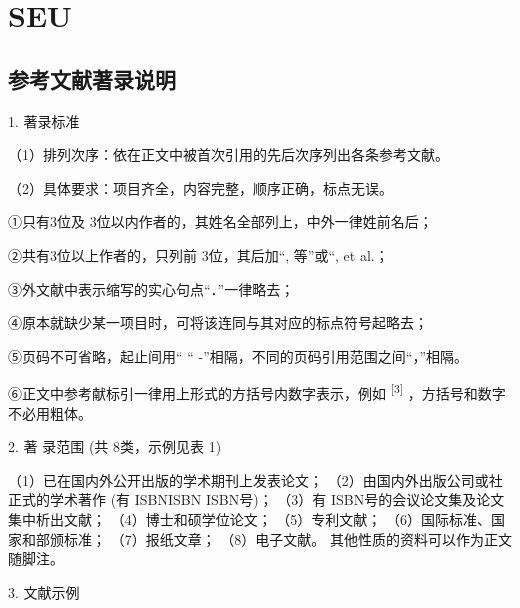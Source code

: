 \documentclass{article}
\begin{document}
\section*{SEU}
\subsection{参考文献著录说明}

1. 著录标准

（1）排列次序：依在正文中被首次引用的先后次序列出各条参考文献。

（2）具体要求：项目齐全，内容完整，顺序正确，标点无误。

①只有3位及 3位以内作者的，其姓名全部列上，中外一律姓前名后；

②共有3位以上作者的，只列前 3位，其后加“, 等”或“, et al.；

③外文献中表示缩写的实心句点“．”一律略去；

④原本就缺少某一项目时，可将该连同与其对应的标点符号起略去；

⑤页码不可省略，起止间用“ “ -”相隔，不同的页码引用范围之间“，”相隔。

⑥正文中参考献标引一律用上形式的方括号内数字表示，例如\textsuperscript{ [3] }，方括号和数字不必用粗体。

2. 著 录范围 (共 8类，示例见表 1)

（1）已在国内外公开出版的学术期刊上发表论文；
（2）由国内外出版公司或社正式的学术著作 (有 ISBNISBN ISBN号)；
（3）有 ISBN号的会议论文集及论文集中析出文献；
（4）博士和硕学位论文；
（5）专利文献；
（6）国际标准、国家和部颁标准；
（7）报纸文章；
（8）电子文献。
其他性质的资料可以作为正文随脚注。

3. 文献示例
\end{document}
